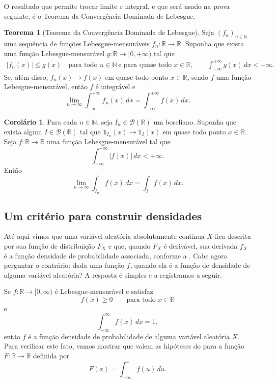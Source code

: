 \documentclass[12pt,portuguese]{article}
\theoremstyle{definition}
\newtheorem{theorem}{Teorema}
\newtheorem{corollary}[corollary]{Corolário}
\theoremstyle{plainexercise}
\theoremstyle{starredexercise}
\theoremstyle{definition}
\begin{document}
O resultado que permite trocar limite e integral, e que será usado na prova
seguinte, é o Teorema da Convergência Dominada de Lebesgue.

\begin{theorem}[Teorema da Convergência Dominada de Lebesgue]
\label{thm:convergencia-dominada}
Seja $(f_n)_{n\in\mathbb{N}}$ uma sequência de funções Lebesgue-mensuráveis
$f_n:\mathbb{R}\to\mathbb{R}$. Suponha que exista uma função
Lebesgue-mensurável $g:\mathbb{R}\to[0,+\infty)$ tal que
\begin{align*}
  |f_n(x)|\leqslant g(x) \quad \text{para todo }n\in\mathbb{N}\,
  \text{e para quase todo }x\in\mathbb{R},
  \qquad \int_{-\infty}^{+\infty} g(x)\,dx< +\infty.
\end{align*}
Se, além disso, $f_n(x)\to f(x)$ em quase todo ponto $x\in\mathbb{R}$, sendo $f$ uma
função Lebesgue-mensurável, então $f$ é integrável e
\[
  \lim_{n\to\infty}\int_{-\infty}^{+\infty} f_n(x)\,dx
  = \int_{-\infty}^{+\infty} f(x)\,dx.
\]
\end{theorem}

\begin{corollary}\label{cor:convergencia-dominada}
Para cada $n\in\mathbb{N}$, seja $I_n\in\mathscr{B}(\mathbb{R})$ um boreliano.
Suponha que exista algum $I\in\mathscr{B}(\mathbb{R})$ tal que
$\mathds{1}_{I_n}(x)\to\mathds{1}_{I}(x)$ em quase todo ponto $x\in\mathbb{R}$.
Seja $f:\mathbb{R}\to\mathbb{R}$ uma função Lebesgue-mensurável tal que
\[
  \int_{-\infty}^{+\infty}|f(x)|\,dx<+\infty.
\]
Então
\[
  \lim_{n\to\infty} \int_{I_n} f(x)\,dx = \int_{I} f(x)\,dx.
\]
\end{corollary}

\subsection{Um critério para construir densidades}

Até aqui vimos que uma variável aleatória absolutamente contínua $X$ fica
descrita por sua função de distribuição $F_X$ e que, quando $F_X$ é derivável,
sua derivada $f_X$ é a função densidade de probabilidade associada, conforme a
. Cabe agora perguntar o contrário: dada uma função $f$,
quando ela é a função de densidade de alguma variável aleatória? A resposta é simples e a
registramos a seguir.

Se $f:\mathbb{R}\to[0,\infty)$ é Lebesgue-mensurável e satisfaz
\begin{equation}
  f(x) \geqslant 0 \qquad \text{para todo } x \in \mathbb{R}
  \label{eq:densidade-nao-negativa}
\end{equation}
e
\begin{equation}
  \int_{-\infty}^{\infty} f(x)\,dx = 1,
  \label{eq:densidade-normalizacao}
\end{equation}
então $f$ é a função densidade de probabilidade de alguma variável
aleatória $X$. Para verificar este fato, vamos mostrar que valem as hipóteses
do  para a função $F:\mathbb{R}\to\mathbb{R}$ definida por
\[
  F(x) = \int_{-\infty}^{x} f(u)\,du.
\]
\end{document}
